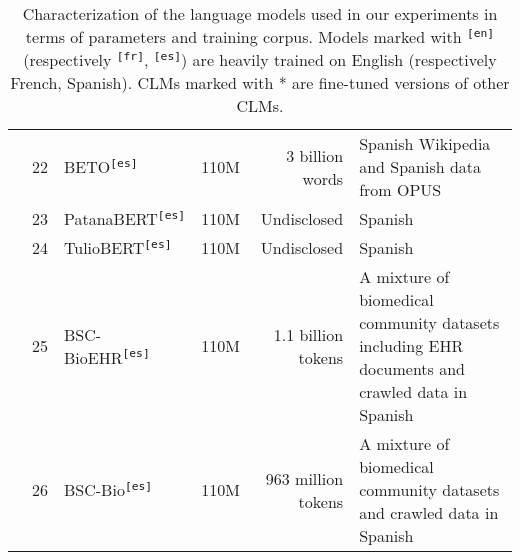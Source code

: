 \begin{table}[ht]
{\begin{tabular}{cllrrl}
 & 22 & BETO\textsuperscript{\texttt{[es]}} \cite{canete2020beto} & 110M & 3 billion words & Spanish Wikipedia and Spanish data from OPUS \cite{tiedemann2012parallel} \\
 & 23 & PatanaBERT\textsuperscript{\texttt{[es]}} & 110M & Undisclosed & Spanish \\
 & 24 & TulioBERT\textsuperscript{\texttt{[es]}} & 110M & Undisclosed & Spanish \\
 & 25 & BSC-BioEHR\textsuperscript{\texttt{[es]}} \cite{carrino2022pretrained} & 110M & 1.1 billion tokens & A mixture of biomedical community datasets including EHR documents and crawled data in Spanish \\
 & 26 & BSC-Bio\textsuperscript{\texttt{[es]}} \cite{carrino2022pretrained} & 110M & 963 million tokens & A mixture of biomedical community datasets and crawled data in Spanish \\
\bottomrule
\end{tabular}}
\caption{Characterization of the language models used in our experiments in terms of parameters and training corpus. Models marked with \textsuperscript{\texttt{[en]}} (respectively \textsuperscript{\texttt{[fr]}}, \textsuperscript{\texttt{[es]}}) are heavily trained on English (respectively French, Spanish). CLMs marked with * are fine-tuned versions of other CLMs.}
\label{tab:LM_features}
\end{table}
